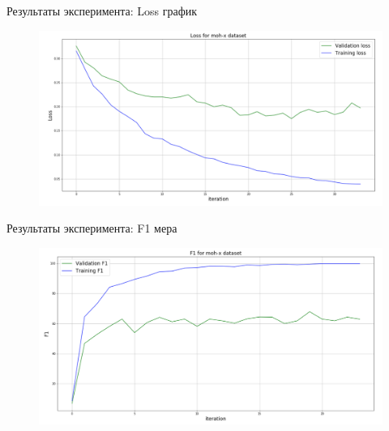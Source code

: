 \documentclass{beamer}
\begin{document}
	\begin{frame}{Результаты эксперимента: Loss график}
		\begin{figure}[H]
			\centering
			\includegraphics[width=1.0\textwidth]{./pics/loss}
		\end{figure}
	\end{frame}
		\begin{frame}{Результаты эксперимента: F1 мера}
			\begin{figure}[H]
				\centering
				\includegraphics[width=1.0\textwidth]{./pics/F1}
			\end{figure}
		\end{frame}
		
\end{document}
